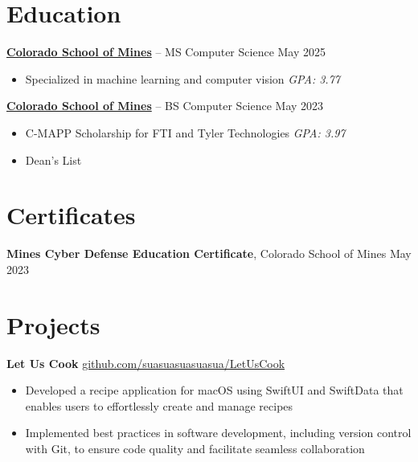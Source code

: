\documentclass[11pt]{article}       %
\begin{document}
\vspace{-18.5pt}

\section*{Education}
\textbf{\href{https://cs.mines.edu}{Colorado School of Mines}} -- MS Computer Science \hfill May 2025 \\
\vspace{-11.5pt}
\begin{itemize}
  \itemsep -0.5em
  \item Specialized in machine learning and computer vision \hfill \textit{GPA: 3.77}
\end{itemize}

\vspace{-6.5pt}

\textbf{\href{https://cs.mines.edu}{Colorado School of Mines}} -- BS Computer Science \hfill May 2023 \\
\vspace{-11.5pt}
\begin{itemize}
  \itemsep -0.5em
  \item C-MAPP Scholarship for FTI and Tyler Technologies \hfill \textit{GPA: 3.97}
  \item Dean's List \hfill
\end{itemize}

\vspace{-18.5pt}

\section*{Certificates}
\textbf{Mines Cyber Defense Education Certificate}, {Colorado School of Mines} \hfill May 2023 \\

\vspace{-6.5pt}

\section*{Projects}
\textbf{Let Us Cook} \hfill \href{https://github.com/suasuasuasuasua/LetUsCook}{github.com/suasuasuasuasua/LetUsCook} \\
\vspace{-9pt}
\begin{itemize}
  \item Developed a recipe application for macOS using SwiftUI and SwiftData
        that enables users to effortlessly create and manage recipes
  \item Implemented best practices in software development, including version
        control with Git, to ensure code quality and facilitate seamless
        collaboration
\end{itemize}
\end{document}
